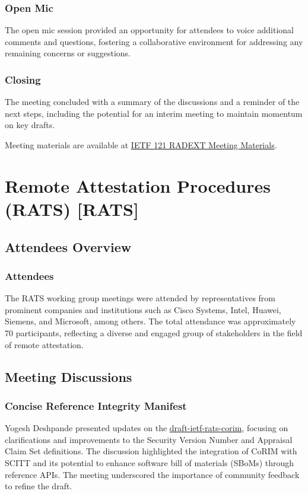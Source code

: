 \documentclass{article}
\begin{document}
\subsubsection{Open Mic}

The open mic session provided an opportunity for attendees to voice additional comments and questions, fostering a collaborative environment for addressing any remaining concerns or suggestions.

\subsubsection{Closing}

The meeting concluded with a summary of the discussions and a reminder of the next steps, including the potential for an interim meeting to maintain momentum on key drafts.

Meeting materials are available at \href{https://www.ietf.org/proceedings/121/radext.html}{IETF 121 RADEXT Meeting Materials}.



\newpage

\section{Remote Attestation Procedures (RATS) [RATS]}

\subsection{Attendees Overview}
\subsubsection{Attendees}
The RATS working group meetings were attended by representatives from prominent companies and institutions such as Cisco Systems, Intel, Huawei, Siemens, and Microsoft, among others. The total attendance was approximately 70 participants, reflecting a diverse and engaged group of stakeholders in the field of remote attestation.

\subsection{Meeting Discussions}

\subsubsection{Concise Reference Integrity Manifest}
Yogesh Deshpande presented updates on the \href{https://datatracker.ietf.org/doc/html/draft-ietf-rats-corim}{draft-ietf-rats-corim}, focusing on clarifications and improvements to the Security Version Number and Appraisal Claim Set definitions. The discussion highlighted the integration of CoRIM with SCITT and its potential to enhance software bill of materials (SBoMs) through reference APIs. The meeting underscored the importance of community feedback to refine the draft.
\end{document}
